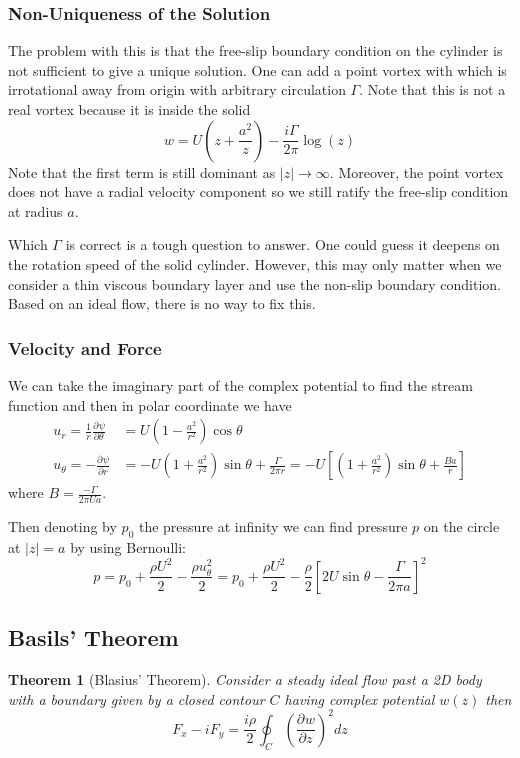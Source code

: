 \documentclass[11pt]{article}
\newcommand*{\pd}[3][]{\ensuremath{\frac{\partial^{#1} {#2}}{\partial {#3}^{#1}}}}
\newcommand{\abs}[1]{\left|#1\right|}
\newtheorem{theorem}{Theorem}[section]
\begin{document}
\subsubsection{Non-Uniqueness of the Solution}
The problem with this is that the free-slip boundary condition on the cylinder is not sufficient to give a unique solution.
One can add a point vortex with which is irrotational away from origin with arbitrary circulation $\Gamma$.
Note that this is not a real vortex because it is inside the solid
\[
	w = U \left( z + \frac{a^2}{z}\right)-\frac{i\Gamma}{2\pi}\log(z)
\]
Note that the first term is still dominant as $\abs{z}\to\infty$.
Moreover, the point vortex does not have a radial velocity component so we still ratify the free-slip condition at radius $a$.

Which $\Gamma$ is correct is a tough question to answer.
One could guess it deepens on the rotation speed of the solid cylinder.
However, this may only matter when we consider a thin viscous boundary layer and use the non-slip boundary condition.
Based on an ideal flow, there is no way to fix this.

\subsubsection{Velocity and Force}
We can take the imaginary part of the complex potential to find the stream function and then in polar coordinate we have
\begin{align*}
	u_r = \frac{1}{r} \pd{\psi}{\theta} &= U \left( 1- \frac{a^2}{r^2}\right)\cos\theta \\
	u_\theta = - \pd{\psi}{r} &= -U \left( 1 + \frac{a^2}{r^2}\right)\sin\theta + \frac{\Gamma}{2\pi r}
	= -U \left[ \left( 1 + \frac{a^2}{r^2}\right)\sin\theta + \frac{Ba}{r}\right]
\end{align*}
where $B = \frac{-\Gamma}{2\pi U a}$.

Then denoting by $p_0$ the pressure at infinity we can find pressure $p$ on the circle at $\abs{z} = a$ by using Bernoulli:
\[
	p= p_0 + \frac{\rho U^2}{2}- \frac{\rho u_\theta^2}{2} = p_0 + \frac{\rho U^2}{2} - \frac{\rho}{2}\left[ 2U \sin\theta - \frac{\Gamma}{2\pi a}\right]^2
\]


\subsection{Basils' Theorem}
\begin{theorem}[Blasius' Theorem]
Consider a steady ideal flow past a 2D body with a boundary given by a closed contour $C$ having complex potential $w(z)$ then
\[
	F_x - i F_y = \frac{i\rho}{2}\oint_C \left( \pd{w}{z}\right)^2 dz
\]
\end{theorem}
\end{document}
